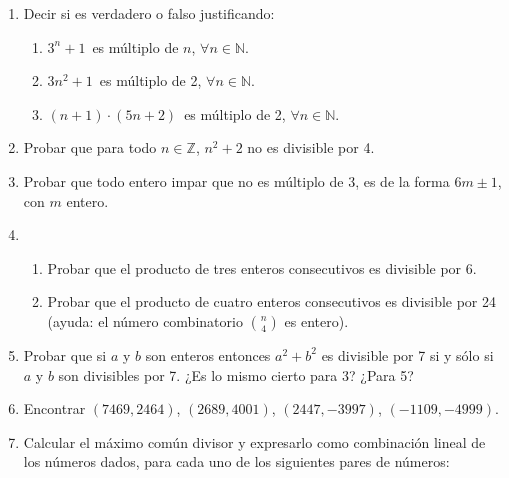 \documentclass[a4paper,12pt,twoside,spanish,reqno]{amsbook}
\numberwithin{equation}{section}
\begin{document}
\begin{enumerate}
\item Decir si es verdadero o falso justificando:
  \begin{enumerate}
  \item $3^n+1$\, es múltiplo de $n$, $\forall n \in {\mathbb N}$.
  \item $3n^2+1$\, es múltiplo de 2, $\forall n \in {\mathbb N}$.
  \item $(n+1)\cdot (5n+2)$\, es múltiplo de 2, $\forall n \in {\mathbb N}$.
  \end{enumerate}


\item Probar que para todo $n \in {\mathbb Z}$, $n^2 + 2$ no es divisible por 4.


\item Probar que todo entero impar que no es múltiplo de 3, es de la forma $6m\pm 1$, con $m$ entero.


\item 
\begin{enumerate}
 \item Probar que el producto de tres enteros consecutivos es divisible por 6.
 \item Probar que el producto de cuatro enteros consecutivos es divisible por 24 (ayuda: el número combinatorio $\binom{n}{4}$ es entero).
\end{enumerate}


\item Probar que si $a$ y $b$ son enteros entonces $a^2+b^2$ es divisible por 7 si y sólo si $a$ y $b$ son divisibles por 7.
¿Es lo mismo cierto para 3? ¿Para 5?



\item Encontrar $(7469,2464)$, $(2689,4001)$, $(2447,-3997)$, $(-1109,-4999)$.


\item
Calcular el máximo común divisor y expresarlo como combinación lineal de los
números dados, para cada uno de  los siguientes pares de números:
\end{enumerate}
\end{document}
